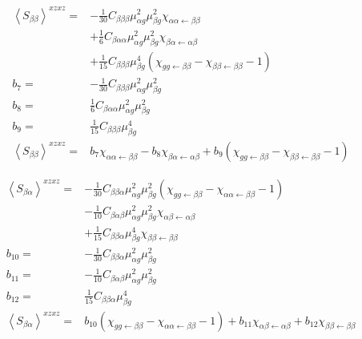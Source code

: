 \begin{align*}
	\left \langle S_{\beta \beta} \right \rangle^{xzxz} =&  -\frac{1}{30}C_{\beta \beta \beta} \mu_{\alpha g}^2 \mu_{\beta g}^2   \chi_{ \alpha \alpha \leftarrow \beta \beta } \\
	&+ \frac{1}{6}C_{ \beta \alpha \alpha} \mu_{\alpha g}^2 \mu_{\beta g}^2 \chi_{\beta  \alpha \leftarrow \alpha \beta } \\
	&+ \frac{1}{15}C_{\beta \beta \beta}  \mu_{\beta g}^4 \left(  \chi_{g g \leftarrow \beta \beta}  -  \chi_{ \beta \beta \leftarrow \beta \beta} -1 \right) \\
	b_7 =&  -\frac{1}{30}C_{\beta \beta \beta} \mu_{\alpha g}^2 \mu_{\beta g}^2 \\
	b_8 =&  \frac{1}{6}C_{ \beta \alpha \alpha} \mu_{\alpha g}^2 \mu_{\beta g}^2  \\
	b_9 =&  \frac{1}{15}C_{\beta \beta \beta}  \mu_{\beta g}^4 \\
	\left \langle S_{\beta \beta} \right \rangle^{xzxz} =&  b_7   \chi_{ \alpha \alpha \leftarrow \beta \beta } - b_8 \chi_{\beta  \alpha \leftarrow \alpha \beta } + b_9 \left(  \chi_{g g \leftarrow \beta \beta}  -  \chi_{ \beta \beta \leftarrow \beta \beta} -1 \right)
\end{align*}


\begin{align*}
	\left \langle S_{\beta \alpha} \right \rangle^{xzxz} =&  -\frac{1}{30}C_{\beta \beta \alpha} \mu_{\alpha g}^2 \mu_{\beta g}^2  \left(  \chi_{g g \leftarrow \beta \beta}  -  \chi_{ \alpha \alpha \leftarrow \beta \beta} -1 \right) \\
	&-\frac{1}{10}C_{ \beta \alpha \beta} \mu_{\alpha g}^2 \mu_{\beta g}^2 \chi_{ \alpha  \beta\leftarrow \alpha \beta } \\
	&+ \frac{1}{15}C_{\beta \beta \alpha}  \mu_{\beta g}^4  \chi_{ \beta \beta \leftarrow \beta \beta } \\
	b_{10} =&  -\frac{1}{30}C_{\beta \beta \alpha} \mu_{\alpha g}^2 \mu_{\beta g}^2 \\
	b_{11} =&  -\frac{1}{10}C_{ \beta \alpha \beta} \mu_{\alpha g}^2 \mu_{\beta g}^2  \\
	b_{12} =&  \frac{1}{15}C_{\beta \beta \alpha}  \mu_{\beta g}^4 \\
	\left \langle S_{\beta \alpha} \right \rangle^{xzxz} =&  b_{10} \left(  \chi_{g g \leftarrow \beta \beta}  -  \chi_{ \alpha \alpha \leftarrow \beta \beta} -1 \right) + b_{11} \chi_{ \alpha  \beta\leftarrow \alpha \beta } + b_{12}  \chi_{ \beta \beta \leftarrow \beta \beta }
\end{align*}

